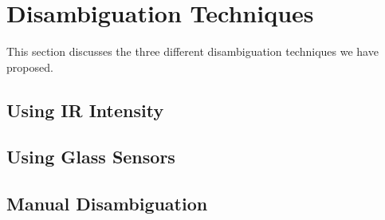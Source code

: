 \section{Disambiguation Techniques}
\label{sec:disamb-techn}

This section discusses the three different disambiguation techniques we have proposed.

\subsection{Using IR Intensity}
\label{sec:using-ir-intensity}

\subsection{Using Glass Sensors}
\label{sec:using-glass-sensors}

\subsection{Manual Disambiguation}
\label{sec:manu-disamb}



